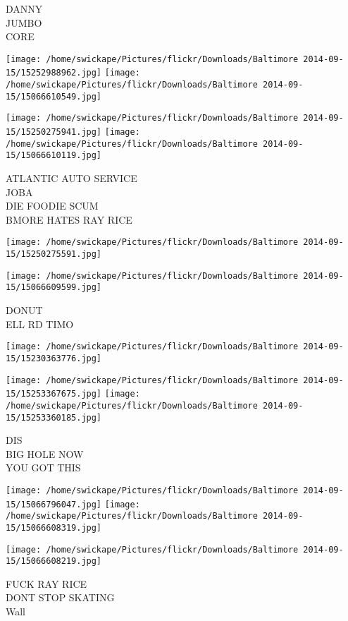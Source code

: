 \documentclass[10pt,letterpaper]{article}
\begin{document}
DANNY\\
JUMBO\\
CORE
\pagebreak

\texttt{[image: /home/swickape/Pictures/flickr/Downloads/Baltimore 2014-09-15/15252988962.jpg]}
\texttt{[image: /home/swickape/Pictures/flickr/Downloads/Baltimore 2014-09-15/15066610549.jpg]}

\texttt{[image: /home/swickape/Pictures/flickr/Downloads/Baltimore 2014-09-15/15250275941.jpg]}
\texttt{[image: /home/swickape/Pictures/flickr/Downloads/Baltimore 2014-09-15/15066610119.jpg]}

ATLANTIC AUTO SERVICE\\
JOBA\\
DIE FOODIE SCUM\\
BMORE HATES RAY RICE
\pagebreak

\texttt{[image: /home/swickape/Pictures/flickr/Downloads/Baltimore 2014-09-15/15250275591.jpg]}

\vspace{0.25in}
\texttt{[image: /home/swickape/Pictures/flickr/Downloads/Baltimore 2014-09-15/15066609599.jpg]}

DONUT\\
ELL RD TIMO
\pagebreak

\texttt{[image: /home/swickape/Pictures/flickr/Downloads/Baltimore 2014-09-15/15230363776.jpg]}

\vspace{0.25in}
\texttt{[image: /home/swickape/Pictures/flickr/Downloads/Baltimore 2014-09-15/15253367675.jpg]}
\texttt{[image: /home/swickape/Pictures/flickr/Downloads/Baltimore 2014-09-15/15253360185.jpg]}

DIS\\
BIG HOLE NOW\\
YOU GOT THIS
\pagebreak

\texttt{[image: /home/swickape/Pictures/flickr/Downloads/Baltimore 2014-09-15/15066796047.jpg]}
\texttt{[image: /home/swickape/Pictures/flickr/Downloads/Baltimore 2014-09-15/15066608319.jpg]}

\vspace{0.25in}
\texttt{[image: /home/swickape/Pictures/flickr/Downloads/Baltimore 2014-09-15/15066608219.jpg]}

FUCK RAY RICE\\
DONT STOP SKATING\\
Wall
\pagebreak
\end{document}
